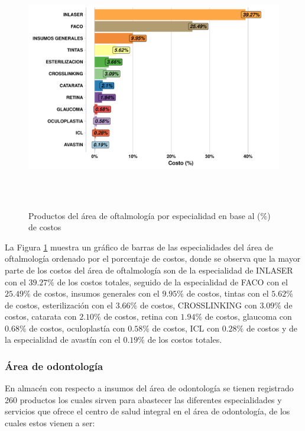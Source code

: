 \newpage

\begin{figure}[h!]
  \caption{Productos del área de oftalmología por especialidad en base al ($\%$) de costos}
  {\includegraphics[width=15cm, height=10cm]{images/oftalm_prod.pdf}}
  \label{fig:Oftalm_espec}
\end{figure}

La Figura \ref{fig:Oftalm_espec} muestra un gráfico de barras de las especialidades del área de oftalmología ordenado por el porcentaje de costos, donde se observa que la mayor parte de los costos del área de oftalmología son de la especialidad de INLASER con el $39.27\%$ de los costos totales, seguido de la especialidad de FACO con el $25.49\%$ de costos, insumos generales con el $9.95\%$ de costos, tintas con el $5.62\%$ de costos, esterilización con el $3.66\%$ de costos, CROSSLINKING con $3.09\%$ de costos, catarata con $2.10\%$ de costos, retina con $1.94\%$ de costos, glaucoma con $0.68\%$ de costos, oculoplastía con $0.58\%$ de costos, ICL con $0.28\%$ de costos y de la especialidad de avastín con el $0.19\%$ de los costos totales.

\newpage

\subsubsection{Área de odontología}

En almacén con respecto a insumos del área de odontología se tienen registrado 260 productos los cuales sirven para abastecer las diferentes especialidades y servicios que ofrece el centro de salud integral en el área de odontología, de los cuales estos vienen a ser:

